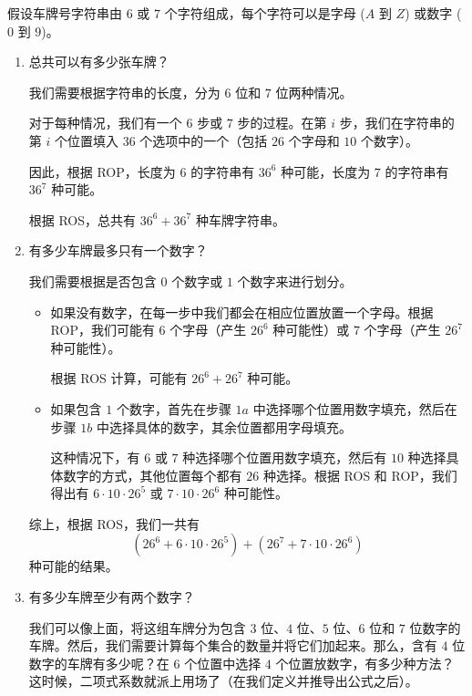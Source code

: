 \begin{example}[车牌]
    假设车牌号字符串由 $6$ 或 $7$ 个字符组成，每个字符可以是字母 ($A$ 到 $Z$) 或数字 ($0$ 到 $9$)。
    \begin{enumerate}[label=(\arabic*)]
        \item 总共可以有多少张车牌？

              我们需要根据字符串的长度，分为 $6$ 位和 $7$ 位两种情况。

              对于每种情况，我们有一个 $6$ 步或 $7$ 步的过程。在第 $i$ 步，我们在字符串的第 $i$ 个位置填入 $36$ 个选项中的一个（包括 $26$ 个字母和 $10$ 个数字）。

              因此，根据 ROP，长度为 $6$ 的字符串有 $36^6$ 种可能，长度为 $7$ 的字符串有 $36^7$ 种可能。

              根据 ROS，总共有 $36^6 + 36^7$ 种车牌字符串。\\
        \item 有多少车牌最多只有一个数字？

              我们需要根据是否包含 $0$ 个数字或 $1$ 个数字来进行划分。
              \begin{itemize}
                  \item 如果没有数字，在每一步中我们都会在相应位置放置一个字母。根据 ROP，我们可能有 $6$ 个字母（产生 $26^6$ 种可能性）或 $7$ 个字母（产生 $26^7$ 种可能性）。

                        根据 ROS 计算，可能有 $26^6 + 26^7$ 种可能。
                  \item 如果包含 $1$ 个数字，首先在步骤 $1a$ 中选择哪个位置用数字填充，然后在步骤 $1b$ 中选择具体的数字，其余位置都用字母填充。

                        这种情况下，有 $6$ 或 $7$ 种选择哪个位置用数字填充，然后有 $10$ 种选择具体数字的方式，其他位置每个都有 $26$ 种选择。根据 ROS 和 ROP，我们得出有 $6 \cdot 10 \cdot 26^5$ 或 $7 \cdot 10 \cdot 26^6$ 种可能性。
              \end{itemize}
              综上，根据 ROS，我们一共有
              \[(26^6 + 6 \cdot 10 \cdot 26^5) + (26^7 + 7 \cdot 10 \cdot 26^6)\]
              种可能的结果。\\
        \item 有多少车牌至少有两个数字？

              我们可以像上面，将这组车牌分为包含 $3$ 位、$4$ 位、$5$ 位、$6$ 位和 $7$ 位数字的车牌。然后，我们需要计算每个集合的数量并将它们加起来。那么，含有 $4$ 位数字的车牌有多少呢？在 $6$ 个位置中选择 $4$ 个位置放数字，有多少种方法？这时候，二项式系数就派上用场了（在我们定义并推导出公式之后）。


\end{enumerate}
\end{example}
